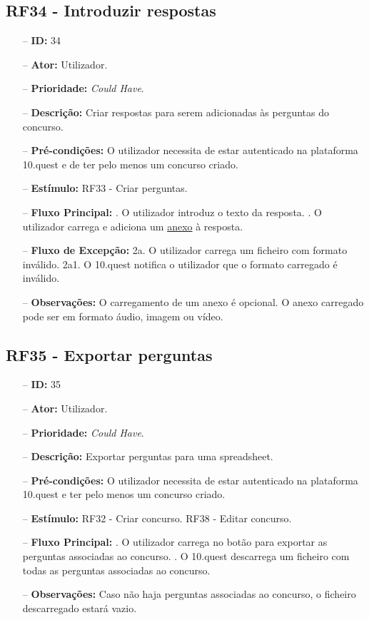 \subsection{RF34 - Introduzir respostas}
\begin{itemize}
	\item[--] \textbf{ID:} 34
	\item[--]  \textbf{Ator:} Utilizador.
	\item[--]  \textbf{Prioridade:} \textit{Could Have}.
	\item[--]  \textbf{Descrição:} Criar respostas para serem adicionadas às perguntas do concurso.
	\item[--]  \textbf{Pré-condições:} O utilizador necessita de estar autenticado na plataforma 10.quest e de ter pelo menos um concurso criado.
	\item[--]  \textbf{Estímulo:} RF33 - Criar perguntas.
	\item[--]  \textbf{Fluxo Principal:} 
	. O utilizador introduz o texto da resposta.
	. O utilizador carrega e adiciona um \underline{anexo} à resposta.
	\item[--]  \textbf{Fluxo de Excepção:} 
	\subitem 2a. O utilizador carrega um ficheiro com formato inválido.
	\subitem 2a1. O 10.quest notifica o utilizador que o formato carregado é inválido.
	\item[--]  \textbf{Observações:} O carregamento de um anexo é opcional. O anexo carregado pode ser em formato áudio, imagem ou vídeo.
\end{itemize}
\newpage

\subsection{RF35 - Exportar perguntas}
\begin{itemize}
	\item[--] \textbf{ID:} 35
	\item[--]  \textbf{Ator:} Utilizador.
	\item[--]  \textbf{Prioridade:} \textit{Could Have}.
	\item[--]  \textbf{Descrição:} Exportar perguntas para uma spreadsheet.
	\item[--]  \textbf{Pré-condições:} O utilizador necessita de estar autenticado na plataforma 10.quest e ter pelo menos um concurso criado.
	\item[--]  \textbf{Estímulo:}  
	\subitem RF32 - Criar concurso.
	\subitem RF38 - Editar concurso.
	\item[--]  \textbf{Fluxo Principal:} 
	. O utilizador carrega no botão para exportar as perguntas associadas ao concurso.
	. O 10.quest descarrega um ficheiro com todas as perguntas associadas ao concurso.
	\item[--]  \textbf{Observações:} Caso não haja perguntas associadas ao concurso, o ficheiro descarregado estará vazio.
\end{itemize}
\newpage

